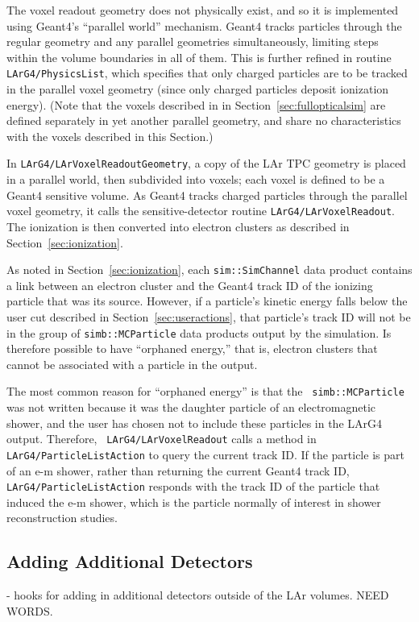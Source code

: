 \documentclass[12pt]{elsarticle}
\begin{document}
The voxel readout geometry does not physically exist, and so it is
implemented using Geant4's ``parallel world'' mechanism. Geant4 tracks
particles through the regular geometry and any parallel geometries
simultaneously, limiting steps within the volume boundaries in all of
them. This is further refined in routine {\tt LArG4/PhysicsList},
which specifies that only charged particles are to be tracked in the
parallel voxel geometry (since only charged particles deposit
ionization energy). (Note that the voxels described in in
Section~\ref{sec:fullopticalsim} are defined separately in yet another
parallel geometry, and share no characteristics with the voxels
described in this Section.)

In {\tt LArG4/LArVoxelReadoutGeometry}, a copy of the LAr TPC geometry
is placed in a parallel world, then subdivided into voxels; each voxel
is defined to be a Geant4 sensitive volume. As Geant4 tracks charged
particles through the parallel voxel geometry, it calls the
sensitive-detector routine {\tt LArG4/LArVoxelReadout}. The ionization
is then converted into electron clusters as described in
Section~\ref{sec:ionization}.

As noted in Section~\ref{sec:ionization}, each {\tt sim::SimChannel}
data product contains a link between an electron cluster and the
Geant4 track ID of the ionizing particle that was its source. However,
if a particle's kinetic energy falls below the user cut described in
Section~\ref{sec:useractions}, that particle's track ID will not be in
the group of {\tt simb::MCParticle} data products output by the
simulation. Is therefore possible to have ``orphaned energy,'' that
is, electron clusters that cannot be associated with a particle in the
output. 

The most common reason for ``orphaned energy'' is that the {\tt
  simb::MCParticle} was not written because it was the daughter
particle of an electromagnetic shower, and the user has chosen not to
include these particles in the LArG4 output. Therefore, {\tt
  LArG4/LArVoxelReadout} calls a method in {\tt
  LArG4/ParticleListAction} to query the current track ID. If the
particle is part of an e-m shower, rather than returning the current
Geant4 track ID, {\tt LArG4/ParticleListAction} responds with the
track ID of the particle that induced the e-m shower, which is the
particle normally of interest in shower reconstruction studies.

\subsection{Adding Additional Detectors}
- hooks for adding in additional detectors outside of the LAr volumes. 
NEED WORDS.
\end{document}
